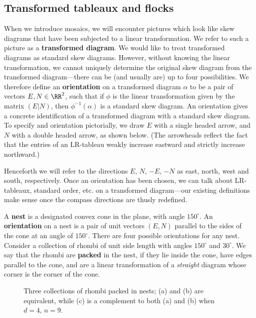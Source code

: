 \subsection{Transformed tableaux and flocks}
When we introduce mosaics, we will encounter pictures which look
like skew diagrams that have been subjected to a linear transformation.  
We refer to such a picture as a {\bf transformed diagram}.
We would like to treat transformed diagrams as standard skew diagrams.
However, without knowing the linear transformation, we 
cannot uniquely determine the original skew diagram from the
transformed diagram---there can be (and usually are) up to four 
possibilities.  We therefore define an {\bf orientation} 
on a transformed diagram $\alpha$ to be a pair of vectors 
$E,N \in \RR^2$, such that if 
$\phi$ is the linear transformation given by the 
matrix $(E|N)$, then $\phi^{-1}(\alpha)$ is a standard skew diagram.  
An orientation gives a concrete identification of a transformed diagram
with a standard skew diagram.  To specify and orientation pictorially, 
we draw $E$ with a single headed 
arrow, and $N$ with a double headed arrow, as shown below.
(The arrowheads reflect the fact that the entries of an LR-tableau
weakly increase eastward and strictly increase northward.)
\centerline{}
Henceforth we will refer to the directions $E$, $N$, $-E$, $-N$ as east,
north, west and south, respectively.  Once an orientation has been chosen,
we can talk about LR-tableaux, standard order, etc. 
on a transformed diagram---our existing definitions make sense once
the compass directions are thusly redefined.

A {\bf nest} is a designated convex cone in the plane, with 
angle $150^\circ$.
An {\bf orientation} on a nest is a pair of unit vectors $(E,N)$ parallel
to the sides of the cone at an angle of $150^\circ$.  There are
four possible orientations for any nest.
Consider a collection of rhombi of unit side length
with angles $150^\circ$ and $30^\circ$.  We say that the rhombi
are {\bf packed} in the nest, if they lie inside the cone, have
edges parallel to the cone, and are a linear transformation
of a {\em straight} diagram whose corner is the corner of the cone.

%
\begin{figure}[htbp]
\begin{center}
\caption{Three collections of rhombi packed in nests; (a) and (b)
are equivalent, while (c) is a complement to both (a) and (b)
when $d=4$, $n=9$.}
\label{fig:equivcomp}
\end{center}
\end{figure}
%

